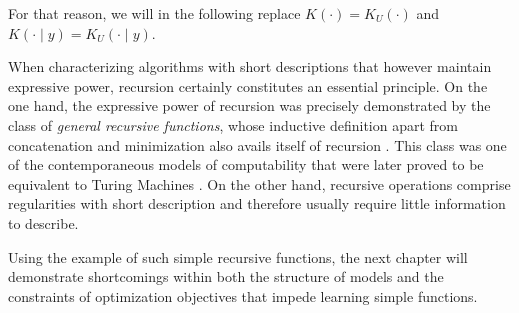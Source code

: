For that reason, we will in the following replace $K(\cdot)=K_U(\cdot)$ and $K(\cdot \mid y)=K_U(\cdot \mid y)$.

When characterizing algorithms with short descriptions that however maintain expressive power, recursion certainly constitutes an essential principle.
On the one hand, the expressive power of recursion was precisely demonstrated by the class of \textit{general recursive functions}, whose inductive definition apart from concatenation and minimization also avails itself of recursion \cite{godel1931formal}.
This class was one of the contemporaneous models of computability that were later proved to be equivalent to Turing Machines \cite{turing1937computability}.
On the other hand, recursive operations comprise regularities with short description and therefore usually require little information to describe.

Using the example of such simple recursive functions, the next chapter will demonstrate shortcomings within both the structure of models and the constraints of optimization objectives that impede learning simple functions.



